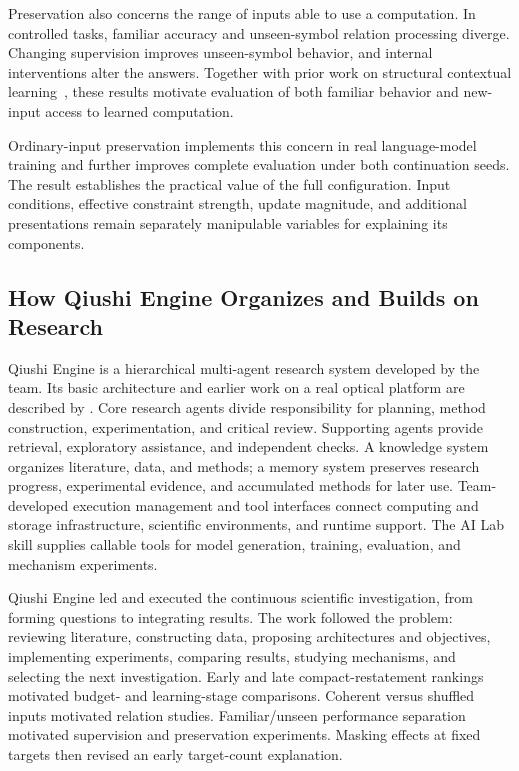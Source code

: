 Preservation also concerns the range of inputs able to use a computation. In controlled tasks, familiar accuracy and unseen-symbol relation processing diverge. Changing supervision improves unseen-symbol behavior, and internal interventions alter the answers. Together with prior work on structural contextual learning~\citep{anand2025dual}, these results motivate evaluation of both familiar behavior and new-input access to learned computation.

Ordinary-input preservation implements this concern in real language-model training and further improves complete evaluation under both continuation seeds. The result establishes the practical value of the full configuration. Input conditions, effective constraint strength, update magnitude, and additional presentations remain separately manipulable variables for explaining its components.

\subsection{How Qiushi Engine Organizes and Builds on Research}
\label{sec:research_organization}

Qiushi Engine is a hierarchical multi-agent research system developed by the team. Its basic architecture and earlier work on a real optical platform are described by \citet{yang2026optical}. Core research agents divide responsibility for planning, method construction, experimentation, and critical review. Supporting agents provide retrieval, exploratory assistance, and independent checks. A knowledge system organizes literature, data, and methods; a memory system preserves research progress, experimental evidence, and accumulated methods for later use. Team-developed execution management and tool interfaces connect computing and storage infrastructure, scientific environments, and runtime support. The AI Lab skill supplies callable tools for model generation, training, evaluation, and mechanism experiments.

Qiushi Engine led and executed the continuous scientific investigation, from forming questions to integrating results. The work followed the problem: reviewing literature, constructing data, proposing architectures and objectives, implementing experiments, comparing results, studying mechanisms, and selecting the next investigation. Early and late compact-restatement rankings motivated budget- and learning-stage comparisons. Coherent versus shuffled inputs motivated relation studies. Familiar/unseen performance separation motivated supervision and preservation experiments. Masking effects at fixed targets then revised an early target-count explanation.

